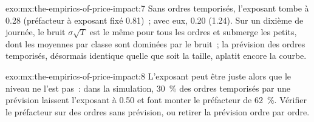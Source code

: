 \begin{solution}{exo:mx:the-empirics-of-price-impact:7}
Sans ordres temporisés, l'exposant tombe à 0.28 (préfacteur à exposant fixé 0.81)~; avec eux, 0.20 (1.24). Sur un dixième de journée, le bruit
$\sigma\sqrt T$ est le même pour tous les ordres et submerge les petits, dont les moyennes par classe sont dominées par le bruit~; la prévision des ordres temporisés, désormais identique
quelle que soit la taille, aplatit encore la courbe.
\end{solution}

\begin{solution}{exo:mx:the-empirics-of-price-impact:8}
L'exposant peut être juste alors que le niveau ne l'est pas~: dans la simulation, 30~\% des ordres temporisés par une prévision laissent l'exposant à 0.50 et font monter le préfacteur
de 62~\%. Vérifier le préfacteur sur des ordres sans prévision, ou retirer la prévision ordre par ordre.
\end{solution}

